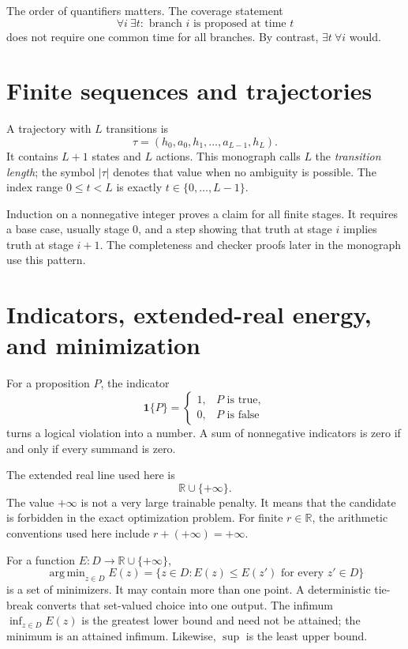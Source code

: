 \documentclass[11pt,oneside]{book}
\theoremstyle{remark}
\newcommand{\one}{\mathbf 1}
\DeclareMathOperator*{\argmin}{arg\,min}
\begin{document}
The order of quantifiers matters. The coverage statement
\[
\forall i\ \exists t:\text{ branch }i\text{ is proposed at time }t
\]
does not require one common time for all branches. By contrast,
$\exists t\ \forall i$ would.

\section*{Finite sequences and trajectories}

A trajectory with $L$ transitions is
\[
\tau=(h_0,a_0,h_1,\ldots,a_{L-1},h_L).
\]
It contains $L+1$ states and $L$ actions. This monograph calls $L$ the
\emph{transition length}; the symbol $|\tau|$ denotes that value when no
ambiguity is possible. The index range $0\le t<L$ is exactly
$t\in\{0,\ldots,L-1\}$.

Induction on a nonnegative integer proves a claim for all finite stages. It
requires a base case, usually stage $0$, and a step showing that truth at stage
$i$ implies truth at stage $i+1$. The completeness and checker proofs later in
the monograph use this pattern.

\section*{Indicators, extended-real energy, and minimization}

For a proposition $P$, the indicator
\[
\one\{P\}=
\begin{cases}
1,&P\text{ is true},\\
0,&P\text{ is false}
\end{cases}
\]
turns a logical violation into a number. A sum of nonnegative indicators is
zero if and only if every summand is zero.

The extended real line used here is
\[
\mathbb R\cup\{+\infty\}.
\]
The value $+\infty$ is not a very large trainable penalty. It means that the
candidate is forbidden in the exact optimization problem. For finite
$r\in\mathbb R$, the arithmetic conventions used here include
$r+(+\infty)=+\infty$.

For a function $E:D\to\mathbb R\cup\{+\infty\}$,
\[
\argmin_{z\in D}E(z)
=\{z\in D:E(z)\le E(z')\text{ for every }z'\in D\}
\]
is a set of minimizers. It may contain more than one point. A deterministic
tie-break converts that set-valued choice into one output. The infimum
$\inf_{z\in D}E(z)$ is the greatest lower bound and need not be attained;
the minimum is an attained infimum. Likewise, $\sup$ is the least upper bound.
\end{document}
